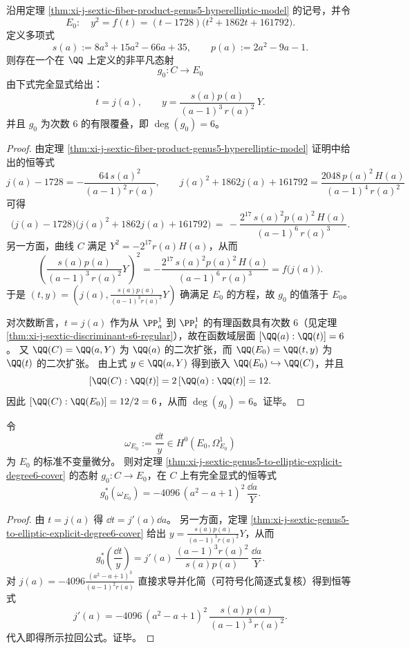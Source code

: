 \begin{theorem}[属 \(5\) 超椭圆曲线到判别式椭圆曲线的显式六次覆叠]\label{thm:xi-j-sextic-genus5-to-elliptic-explicit-degree6-cover}
沿用定理 \ref{thm:xi-j-sextic-fiber-product-genus5-hyperelliptic-model} 的记号，并令
\[
E_0:\quad y^2=f(t)=(t-1728)\bigl(t^2+1862t+161792\bigr).
\]
定义多项式
\[
s(a):=8a^3+15a^2-66a+35,\qquad p(a):=2a^2-9a-1.
\]
则存在一个在 \(\QQ\) 上定义的非平凡态射
\[
g_0:C\longrightarrow E_0
\]
由下式完全显式给出：
\[
\boxed{\quad t=j(a),\qquad y=\frac{s(a)p(a)}{(a-1)^3\,r(a)^2}\,Y.\quad}
\]
并且 \(g_0\) 为次数 \(6\) 的有限覆叠，即 \(\deg(g_0)=6\)。
\end{theorem}
\begin{proof}
由定理 \ref{thm:xi-j-sextic-fiber-product-genus5-hyperelliptic-model} 证明中给出的恒等式
\[
j(a)-1728=-\frac{64\,s(a)^2}{(a-1)^2\,r(a)},
\qquad
j(a)^2+1862j(a)+161792=\frac{2048\,p(a)^2\,H(a)}{(a-1)^4\,r(a)^2}
\]
可得
\[
\bigl(j(a)-1728\bigr)\bigl(j(a)^2+1862j(a)+161792\bigr)
\,=\,
-\frac{2^{17}\,s(a)^2p(a)^2\,H(a)}{(a-1)^6\,r(a)^3}.
\]
另一方面，曲线 \(C\) 满足 \(Y^2=-2^{17}r(a)H(a)\)，从而
\[
\left(\frac{s(a)p(a)}{(a-1)^3\,r(a)^2}Y\right)^2
=
-\frac{2^{17}\,s(a)^2p(a)^2\,H(a)}{(a-1)^6\,r(a)^3}
=
f\bigl(j(a)\bigr).
\]
于是 \((t,y)=(j(a),\frac{s(a)p(a)}{(a-1)^3r(a)^2}Y)\) 确满足 \(E_0\) 的方程，故 \(g_0\) 的值落于 \(E_0\)。

对次数断言，\(t=j(a)\) 作为从 \(\PP^1_a\) 到 \(\PP^1_t\) 的有理函数具有次数 \(6\)（见定理 \ref{thm:xi-j-sextic-discriminant-s6-regular}），故在函数域层面
\(
[\QQ(a):\QQ(t)]=6
\)。
又 \(\QQ(C)=\QQ(a,Y)\) 为 \(\QQ(a)\) 的二次扩张，而 \(\QQ(E_0)=\QQ(t,y)\) 为 \(\QQ(t)\) 的二次扩张。
由上式 \(y\in \QQ(a,Y)\) 得到嵌入 \(\QQ(E_0)\hookrightarrow \QQ(C)\)，并且
\[
[\QQ(C):\QQ(t)]=2\,[\QQ(a):\QQ(t)]=12.
\]
因此
\(
[\QQ(C):\QQ(E_0)]=12/2=6
\)，从而 \(\deg(g_0)=6\)。证毕。
\end{proof}

\begin{theorem}[不变量微分的拉回消去]\label{thm:xi-j-sextic-invariant-differential-pullback-quartic-factor}
令
\[
\omega_{E_0}:=\frac{\dd t}{y}\in H^0(E_0,\Omega^1_{E_0})
\]
为 \(E_0\) 的标准不变量微分。
则对定理 \ref{thm:xi-j-sextic-genus5-to-elliptic-explicit-degree6-cover} 的态射 \(g_0:C\to E_0\)，在 \(C\) 上有完全显式的恒等式
\[
\boxed{\quad g_0^*(\omega_{E_0})=-4096\,(a^2-a+1)^2\,\frac{\dd a}{Y}.\quad}
\]
\end{theorem}
\begin{proof}
由 \(t=j(a)\) 得 \(\dd t=j'(a)\dd a\)。
另一方面，定理 \ref{thm:xi-j-sextic-genus5-to-elliptic-explicit-degree6-cover} 给出
\(
y=\frac{s(a)p(a)}{(a-1)^3r(a)^2}Y
\)，从而
\[
g_0^*\!\left(\frac{\dd t}{y}\right)
=
j'(a)\,\frac{(a-1)^3r(a)^2}{s(a)p(a)}\,\frac{\dd a}{Y}.
\]
对 \(j(a)=-4096\frac{(a^2-a+1)^3}{(a-1)^2r(a)}\) 直接求导并化简（可符号化简逐式复核）得到恒等式
\[
j'(a)=-4096\,(a^2-a+1)^2\,\frac{s(a)p(a)}{(a-1)^3\,r(a)^2}.
\]
代入即得所示拉回公式。证毕。
\end{proof}

